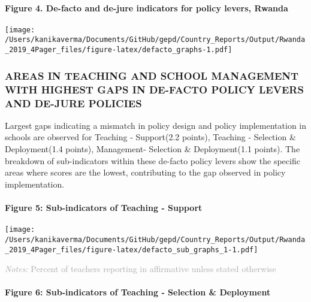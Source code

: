 \documentclass[
  twocolumn]{article}
\begin{document}
\hypertarget{figure-4.-de-facto-and-de-jure-indicators-for-policy-levers-rwanda}{%
\paragraph{Figure 4. De-facto and de-jure indicators for policy levers,
Rwanda}\label{figure-4.-de-facto-and-de-jure-indicators-for-policy-levers-rwanda}}

\texttt{[image: /Users/kanikaverma/Documents/GitHub/gepd/Country\_Reports/Output/Rwanda\_2019\_4Pager\_files/figure-latex/defacto\_graphs-1.pdf]}

\hypertarget{areas-in-teaching-and-school-management-with-highest-gaps-in-de-facto-policy-levers-and-de-jure-policies}{%
\subsubsection{\texorpdfstring{\textbf{AREAS IN TEACHING AND SCHOOL
MANAGEMENT WITH HIGHEST GAPS IN DE-FACTO POLICY LEVERS AND DE-JURE
POLICIES}}{AREAS IN TEACHING AND SCHOOL MANAGEMENT WITH HIGHEST GAPS IN DE-FACTO POLICY LEVERS AND DE-JURE POLICIES}}\label{areas-in-teaching-and-school-management-with-highest-gaps-in-de-facto-policy-levers-and-de-jure-policies}}

Largest gaps indicating a mismatch in policy design and policy
implementation in schools are observed for Teaching - Support(2.2
points), Teaching - Selection \& Deployment(1.4 points), Management-
Selection \& Deployment(1.1 points). The breakdown of sub-indicators
within these de-facto policy levers show the specific areas where scores
are the lowest, contributing to the gap observed in policy
implementation. \vfill\null

\hypertarget{figure-5-sub-indicators-of-teaching---support}{%
\paragraph{Figure 5: Sub-indicators of Teaching -
Support}\label{figure-5-sub-indicators-of-teaching---support}}

\texttt{[image: /Users/kanikaverma/Documents/GitHub/gepd/Country\_Reports/Output/Rwanda\_2019\_4Pager\_files/figure-latex/defacto\_sub\_graphs\_1-1.pdf]}

{\scriptsize
    \textcolor{darkgray}{\textit{Notes:} Percent of teachers reporting in affirmative unless stated otherwise}
  }

\hypertarget{figure-6-sub-indicators-of-teaching---selection-deployment}{%
\paragraph{Figure 6: Sub-indicators of Teaching - Selection \&
Deployment}\label{figure-6-sub-indicators-of-teaching---selection-deployment}}
\end{document}
